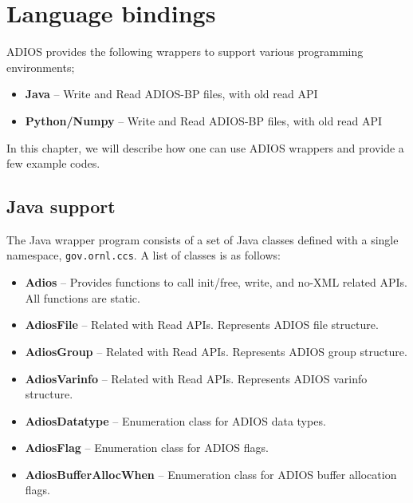\chapter{Language bindings}

ADIOS provides the following wrappers to support various programming environments; 
\begin{itemize}
\item{\bf Java} -- Write and Read ADIOS-BP files, with old read API
\item{\bf Python/Numpy} -- Write and Read ADIOS-BP files, with old read API
\end{itemize}

In this chapter, we will describe how one can use ADIOS wrappers and provide a few example codes.

\section{Java support}
\label{section-bindings-java}
The Java wrapper program consists of a set of Java classes defined with a single namespace, \verb+gov.ornl.ccs+. A list of classes is as follows:
\begin{itemize}
\item{\bf Adios} -- Provides functions to call init/free, write, and no-XML related APIs. All functions are static.
\item{\bf AdiosFile} -- Related with Read APIs. Represents ADIOS file structure.
\item{\bf AdiosGroup} -- Related with Read APIs. Represents ADIOS group structure. 
\item{\bf AdiosVarinfo} -- Related with Read APIs. Represents ADIOS varinfo structure.
\item{\bf AdiosDatatype} -- Enumeration class for ADIOS data types.
\item{\bf AdiosFlag} -- Enumeration class for ADIOS flags.
\item{\bf AdiosBufferAllocWhen} -- Enumeration class for ADIOS buffer allocation flags.
\end{itemize}

